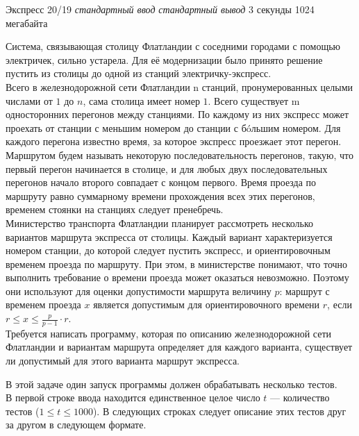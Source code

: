 \begin{problem}%
{Экспресс 20/19}%
{\textsl{стандартный ввод}}%
{\textsl{стандартный вывод}}%
{3 секунды}%
{1024 мегабайта}{}

Система, связывающая столицу Флатландии с соседними городами с помощью электричек, сильно устарела. Для её модернизации было принято решение пустить из столицы до одной из станций электричку-экспресс.\\

Всего в железнодорожной сети Флатландии n станций, пронумерованных целыми числами от $1$ до $n$, сама столица имеет номер $1$. Всего существует m односторонних перегонов между станциями. По каждому из них экспресс может проехать от станции с меньшим номером до станции с бóльшим номером. Для каждого перегона известно время, за которое экспресс проезжает этот перегон.\\

Маршрутом будем называть некоторую последовательность перегонов, такую, что первый перегон начинается в столице, и для любых двух последовательных перегонов начало второго совпадает с концом первого. Время проезда по маршруту равно суммарному времени прохождения всех этих перегонов, временем стоянки на станциях следует пренебречь.\\

Министерство транспорта Флатландии планирует рассмотреть несколько вариантов маршрута экспресса от столицы. Каждый вариант характеризуется номером станции, до которой следует пустить экспресс, и ориентировочным временем проезда по маршруту. При этом, в министерстве понимают, что точно выполнить требование о времени проезда может оказаться невозможно. Поэтому они используют для оценки допустимости маршрута величину $p$: маршрут с временем проезда $x$ является допустимым для ориентировочного времени $r$, если $r \le x \le \frac{p}{p-1} \cdot r$.\\

Требуется написать программу, которая по описанию железнодорожной сети Флатландии и вариантам маршрута определяет для каждого варианта, существует ли допустимый для этого варианта маршрут экспресса.

\InputFile

В этой задаче один запуск программы должен обрабатывать несколько тестов.\\

В первой строке ввода находится единственное целое число $t$ — количество тестов ($1 \le t \le 1000$). В следующих строках следует описание этих тестов друг за другом в следующем формате.\\


\end{problem}
